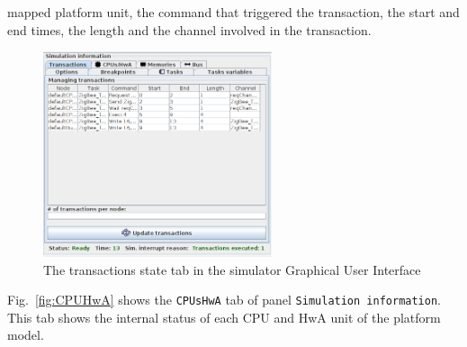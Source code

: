 \documentclass{llncs}
\begin{document}
mapped platform unit, the command that triggered the transaction, the start and end times, the length and the channel
involved in the transaction.
%
\begin{figure}[!htbp]
	\centering
	\includegraphics[width=0.6\textwidth]{figures/screenshot/Transactions.png}
	\caption{The transactions state tab in the simulator Graphical User Interface}
	\label{fig:Transactions}
\end{figure}
%
Fig.~\ref{fig:CPUHwA} shows the \texttt{CPUsHwA} tab of panel \texttt{Simulation information}. This tab shows the
internal status of each CPU and HwA unit of the platform model.
\end{document}
